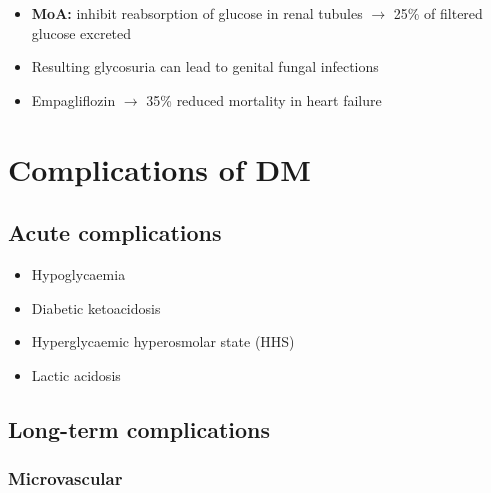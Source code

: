 \documentclass[
  12pt,
]{memoir}
\providecommand{\tightlist}{%
  \setlength{\itemsep}{0pt}\setlength{\parskip}{0pt}}
\begin{document}
\begin{itemize}
  \begin{itemize}
  \tightlist
  \item
    \textbf{MoA:} inhibit reabsorption of glucose in renal tubules
    \(\rightarrow\) 25\% of filtered glucose excreted
  \item
    Resulting glycosuria can lead to genital fungal infections
  \item
    Empagliflozin \(\rightarrow\) 35\% reduced mortality in heart
    failure
  \end{itemize}
\end{itemize}

\hypertarget{complications-of-dm}{%
\section{Complications of DM}\label{complications-of-dm}}

\hypertarget{acute-complications}{%
\subsection{Acute complications}\label{acute-complications}}

\begin{itemize}
\tightlist
\item
  Hypoglycaemia
\item
  Diabetic ketoacidosis
\item
  Hyperglycaemic hyperosmolar state (HHS)
\item
  Lactic acidosis
\end{itemize}

\hypertarget{long-term-complications}{%
\subsection{Long-term complications}\label{long-term-complications}}

\hypertarget{microvascular}{%
\subsubsection{Microvascular}\label{microvascular}}
\end{document}
